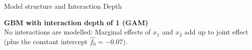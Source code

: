 \begin{vbframe}{Model structure and Interaction Depth}
%

\framebreak

\textbf{GBM with interaction depth of 1 (GAM)}\\
No interactions are modelled: Marginal effects of $x_1$ and $x_2$ add up to joint effect (plus the constant intercept $\hat{f_0} = -0.07$).

\vspace{0.5cm}


\end{vbframe}

